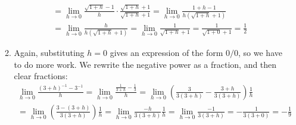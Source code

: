 \documentclass{article}
\begin{document}
\begin{enumerate}
\begin{enumerate}
\begin{multline*}
      = \lim_{h\to 0} \frac{\sqrt{1+h}-1}{h} \cdot 
      \frac{\sqrt{1+h}+1}{\sqrt{1+h}+1}
      = \lim_{h\to 0} \frac{1+h - 1}{h(\sqrt{1+h}+1)}
      \\
      = \lim_{h\to 0} \frac{h}{h(\sqrt{1+h}+1)}
      = \lim_{h\to 0} \frac{1}{\sqrt{1+h}+1} 
      = \frac{1}{\sqrt{1+0}+1} = \frac{1}{2}
    \end{multline*}
  \item %
    Again, substituting $h=0$ gives an expression of the form $0/0$, so we
    have to do more work.  We rewrite the negative power as a fraction, and
    then clear fractions:
    \begin{multline*}
      \lim_{h\to 0} \frac{(3+h)^{-1} - 3^{-1}}{h}
      = \lim_{h\to 0}\frac{\frac{1}{3+h}-\frac{1}{3}}{h}
      = \lim_{h\to 0} \left(\frac{3}{3(3+h)}-\frac{3+h}{3(3+h)}\right) 
      \frac{1}{h}
      \\
      = \lim_{h\to 0} \left(\frac{3-(3+h)}{3(3+h)}\right) \frac{1}{h}
      = \lim_{h\to 0} \frac{-h}{3(3+h)} \frac{1}{h}
      = \lim_{h\to 0} \frac{-1}{3(3+h)}
      = -\frac{1}{3(3+0)} = -\frac{1}{9}
    \end{multline*}
  \end{enumerate}

\end{enumerate}
\end{document}
